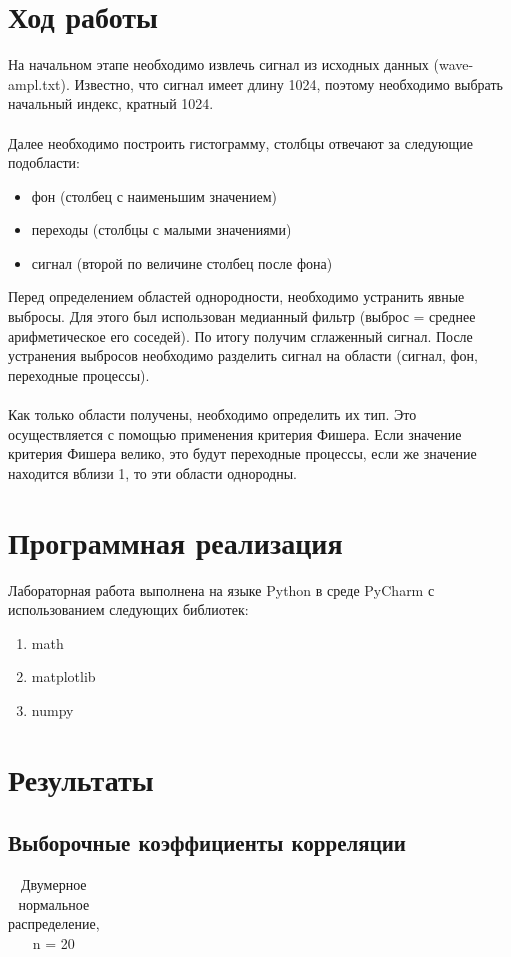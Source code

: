 \documentclass[a4paper]{article}
\begin{document}
\section{Ход работы}
\noindent На начальном этапе необходимо извлечь сигнал из исходных данных
(wave-ampl.txt).
Известно, что сигнал имеет длину 1024, поэтому необходимо
выбрать начальный индекс, кратный 1024.\\\\
\noindent Далее необходимо построить гистограмму, столбцы отвечают за
следующие подобласти:
\begin{itemize}
    \item фон (столбец с наименьшим значением)
    \item переходы (столбцы с малыми значениями)
    \item сигнал (второй по величине столбец после фона)
\end{itemize}
\noindent Перед определением областей однородности, необходимо устранить
явные выбросы.
Для этого был использован медианный фильтр (выброс =
среднее арифметическое его соседей).
По итогу получим сглаженный сигнал.
После устранения выбросов необходимо разделить сигнал на области
(сигнал, фон, переходные процессы). \\\\
\noindent Как только области получены, необходимо определить их тип.
Это
осуществляется с помощью применения критерия Фишера.
Если значение
критерия Фишера велико, это будут переходные процессы, если же значение
находится вблизи 1, то эти области однородны.

\section{Программная реализация}
\noindent Лабораторная работа выполнена на языке Python в среде PyCharm с использованием следующих библиотек:
 \begin{enumerate}
        \item math
        \item matplotlib
        \item numpy
 \end{enumerate}

\section{Результаты}
    \subsection{Выборочные коэффициенты корреляции}
            \begin{table}[H]
                \centering
                \begin{tabular}{| c | c | c | c |}
                    \hline
                    
                \end{tabular}{}
                \caption{Двумерное нормальное распределение, n = 20}
                \label{tab:n20}
            \end{table}
\end{document}
